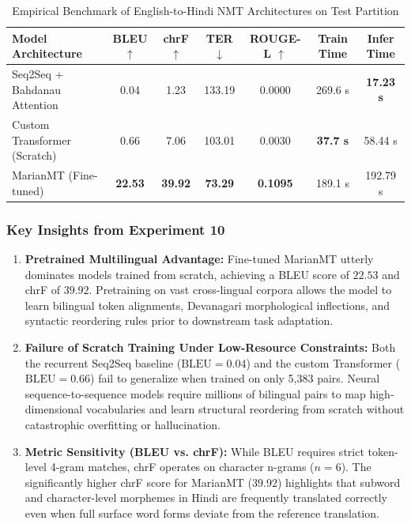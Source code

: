 \documentclass[12pt,a4paper]{report}
\begin{document}
\begin{table}[H]
\centering
\caption{Empirical Benchmark of English-to-Hindi NMT Architectures on Test Partition}
\label{tab:exp10_benchmark_results}
\begin{tabular}{lcccccc}
\toprule
\textbf{Model Architecture} & \textbf{BLEU} $\uparrow$ & \textbf{chrF} $\uparrow$ & \textbf{TER} $\downarrow$ & \textbf{ROUGE-L} $\uparrow$ & \textbf{Train Time} & \textbf{Infer Time} \\
\midrule
Seq2Seq + Bahdanau Attention & 0.04 & 1.23 & 133.19 & 0.0000 & 269.6 s & \textbf{17.23 s} \\
Custom Transformer (Scratch) & 0.66 & 7.06 & 103.01 & 0.0030 & \textbf{37.7 s} & 58.44 s \\
MarianMT (Fine-tuned) & \textbf{22.53} & \textbf{39.92} & \textbf{73.29} & \textbf{0.1095} & 189.1 s & 192.79 s \\
\bottomrule
\end{tabular}
\end{table}

\subsubsection{Key Insights from Experiment 10}
\begin{enumerate}
    \item \textbf{Pretrained Multilingual Advantage:} Fine-tuned MarianMT utterly dominates models trained from scratch, achieving a BLEU score of $\mathbf{22.53}$ and chrF of $\mathbf{39.92}$. Pretraining on vast cross-lingual corpora allows the model to learn bilingual token alignments, Devanagari morphological inflections, and syntactic reordering rules prior to downstream task adaptation.
    \item \textbf{Failure of Scratch Training Under Low-Resource Constraints:} Both the recurrent Seq2Seq baseline ($\text{BLEU} = 0.04$) and the custom Transformer ($\text{BLEU} = 0.66$) fail to generalize when trained on only 5,383 pairs. Neural sequence-to-sequence models require millions of bilingual pairs to map high-dimensional vocabularies and learn structural reordering from scratch without catastrophic overfitting or hallucination.
    \item \textbf{Metric Sensitivity (BLEU vs. chrF):} While BLEU requires strict token-level 4-gram matches, chrF operates on character n-grams ($n=6$). The significantly higher chrF score for MarianMT ($39.92$) highlights that subword and character-level morphemes in Hindi are frequently translated correctly even when full surface word forms deviate from the reference translation.
\end{enumerate}
\end{document}
